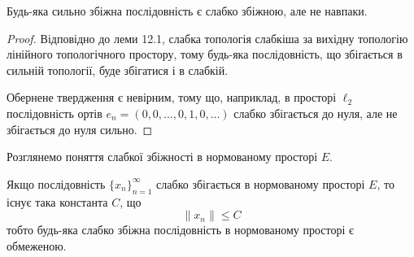 \begin{lemma}
Будь-яка сильно збіжна послідовність є слабко
збіжною, але не навпаки.
\end{lemma}

\begin{proof}
Відповідно до леми 12.1, слабка топологія
слабкіша за вихідну топологію лінійного топологічного
простору, тому будь-яка послідовність, що збігається в
сильній топології, буде збігатися і в слабкій.

Обернене твердження є невірним, тому що, наприклад, в
просторі $\ell_2$ послідовність ортів $e_n = (0, 0, \dots, 0, 1, 0, \dots)$ слабко
збігається до нуля, але не збігається до нуля сильно. 
\end{proof}

Розглянемо поняття слабкої збіжності в нормованому
просторі $E$.

\begin{theorem}
Якщо послідовність $\{x_n\}_{n = 1}^\infty$
слабко збігається в нормованому просторі $E$, то існує така
константа $C$, що
\begin{equation*}
    \|x_n\| \le C
\end{equation*}
тобто будь-яка слабко збіжна послідовність в нормованому
просторі є обмеженою.
\end{theorem}

